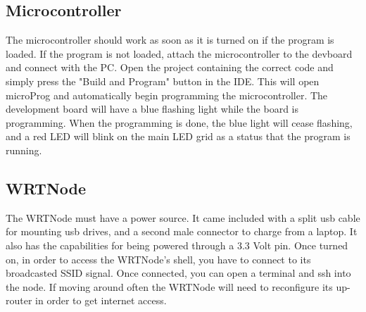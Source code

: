 \documentclass[paper=a4, fontsize=11pt]{scrartcl}
\numberwithin{equation}{section}		%
\numberwithin{figure}{section}			%
\numberwithin{table}{section}				%
\begin{document}
 \subsection{Microcontroller} 
 The microcontroller should work as soon as it is turned on if the program is loaded. If the program is not loaded, attach the microcontroller to the devboard and connect with the PC. Open the project containing the correct code and simply press the "Build and Program" button in the IDE. This will open microProg and automatically begin programming the microcontroller. The development board will have a blue flashing light while the board is programming. When the programming is done, the blue light will cease flashing, and a red LED will blink on the main LED grid as a status that the program is running. \\
 \subsection{WRTNode}
 The WRTNode must have a power source. It came included with a split usb cable for mounting usb drives, and a second male connector to charge from a laptop. It also has the capabilities for being powered through a 3.3 Volt pin. Once turned on, in order to access the WRTNode's shell, you have to connect to its broadcasted SSID signal. Once connected, you can open a terminal and ssh into the node. If moving around often the WRTNode will need to reconfigure its up-router in order to get internet access.\\
\end{document}
